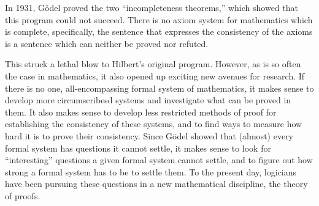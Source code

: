 \documentclass[../../../include/open-logic-section]{subfiles}
\begin{document}
In 1931, G\"odel proved the two ``incompleteness theorems,'' which
showed that this program could not succeed. There is no axiom system
for mathematics which is complete, specifically, the sentence that
expresses the consistency of the axioms is a sentence which can
neither be proved nor refuted.

This struck a lethal blow to Hilbert's original program. However, as
is so often the case in mathematics, it also opened up exciting new
avenues for research. If there is no one, all-encompassing formal
system of mathematics, it makes sense to develop more circumscribesd
systems and investigate what can be proved in them. It also makes
sense to develop less restricted methods of proof for establishing the
consistency of these systems, and to find ways to measure how hard it
is to prove their consistency.  Since G\"odel showed that (almost)
every formal system has questions it cannot settle, it makes sense to
look for ``interesting'' questions a given formal system cannot
settle, and to figure out how strong a formal system has to be to
settle them. To the present day, logicians have been pursuing these
questions in a new mathematical discipline, the theory of proofs.
\end{document}
